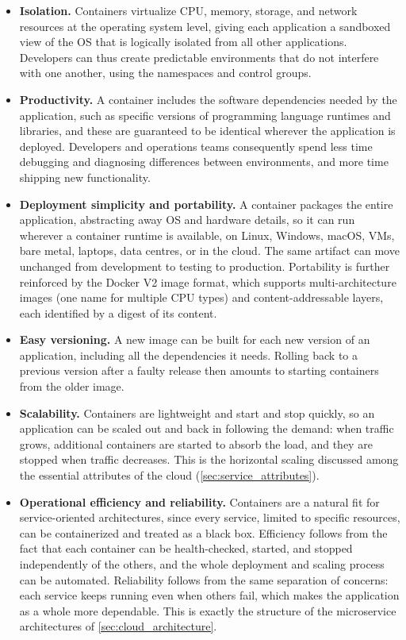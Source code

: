 \begin{itemize}
    \item \textbf{Isolation.} Containers virtualize CPU, memory, storage, and network resources at the operating system level, giving each application a sandboxed view of the OS that is logically isolated from all other applications. Developers can thus create predictable environments that do not interfere with one another, using the namespaces and control groups.
    
    \item \textbf{Productivity.} A container includes the software dependencies needed by the application, such as specific versions of programming language runtimes and libraries, and these are guaranteed to be identical wherever the application is deployed. Developers and operations teams consequently spend less time debugging and diagnosing differences between environments, and more time shipping new functionality.
    
    \item \textbf{Deployment simplicity and portability.} A container packages the entire application, abstracting away OS and hardware details, so it can run wherever a container runtime is available, on Linux, Windows, macOS, VMs, bare metal, laptops, data centres, or in the cloud. The same artifact can move unchanged from development to testing to production. Portability is further reinforced by the Docker V2 image format, which supports multi-architecture images (one name for multiple CPU types) and content-addressable layers, each identified by a digest of its content.
    
    \item \textbf{Easy versioning.} A new image can be built for each new version of an application, including all the dependencies it needs. Rolling back to a previous version after a faulty release then amounts to starting containers from the older image.
    
    \item \textbf{Scalability.} Containers are lightweight and start and stop quickly, so an application can be scaled out and back in following the demand: when traffic grows, additional containers are started to absorb the load, and they are stopped when traffic decreases. This is the horizontal scaling discussed among the essential attributes of the cloud (\cref{sec:service_attributes}).
    
    \item \textbf{Operational efficiency and reliability.} Containers are a natural fit for service-oriented architectures, since every service, limited to specific resources, can be containerized and treated as a black box. Efficiency follows from the fact that each container can be health-checked, started, and stopped independently of the others, and the whole deployment and scaling process can be automated. Reliability follows from the same separation of concerns: each service keeps running even when others fail, which makes the application as a whole more dependable. This is exactly the structure of the microservice architectures of \cref{sec:cloud_architecture}.
    

\end{itemize}
